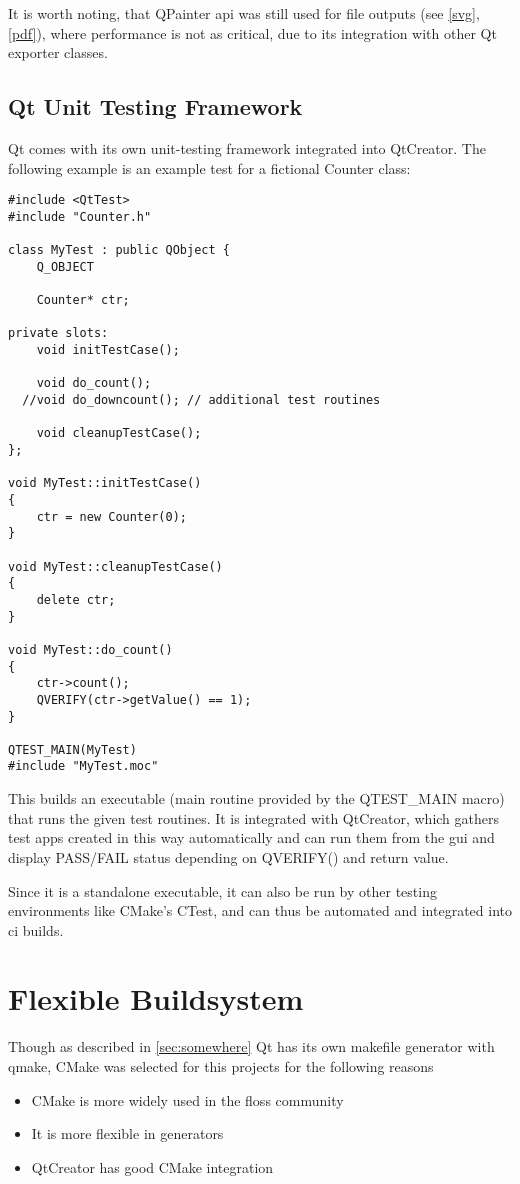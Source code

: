 It is worth noting, that QPainter \gls{api} was still used for file outputs (see \ref{svg}, \ref{pdf}), where performance is not as critical, due to its integration with other Qt exporter classes.

\subsection{Qt Unit Testing Framework}

Qt comes with its own unit-testing framework integrated into QtCreator. The following example is an example test for a fictional Counter class:

\begin{lstlisting}
#include <QtTest>
#include "Counter.h"

class MyTest : public QObject {
    Q_OBJECT

    Counter* ctr;

private slots:
    void initTestCase();

    void do_count();
  //void do_downcount(); // additional test routines

    void cleanupTestCase();
};

void MyTest::initTestCase()
{
	ctr = new Counter(0);
}

void MyTest::cleanupTestCase()
{
    delete ctr;
}

void MyTest::do_count()
{
	ctr->count();
	QVERIFY(ctr->getValue() == 1);
}

QTEST_MAIN(MyTest)
#include "MyTest.moc"
\end{lstlisting}

This builds an executable (main routine provided by the QTEST\_MAIN macro) that runs the given test routines.
It is integrated with QtCreator, which gathers test apps created in this way automatically and can run them from the \gls{gui} and display PASS/FAIL status depending on QVERIFY() and return value.
\begin{figure}[h]
\end{figure}

Since it is a standalone executable, it can also be run by other testing environments like CMake's CTest, and can thus be automated and integrated into \gls{ci} builds.

\begin{figure}[h]
\end{figure}

\section{Flexible Buildsystem}
Though as described in \ref{sec:somewhere} Qt has its own makefile generator with qmake, CMake was selected for this projects for the following reasons
\begin{itemize}
	\item CMake is more widely used in the \gls{floss} community
	\item It is more flexible in generators
	\item QtCreator has good CMake integration
\end{itemize}


